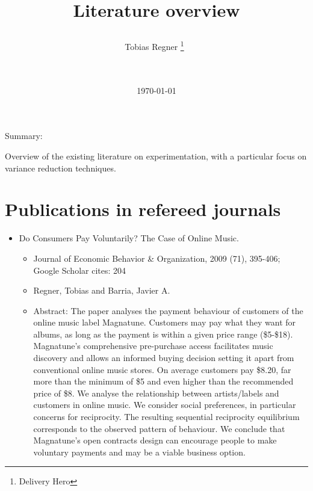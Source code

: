 \documentclass[a4paper,10pt]{article}
\title{\begin{LARGE}Literature overview\end{LARGE}}
\author{Tobias Regner \footnote{Delivery Hero
}~\\
\\
\\
   } %
\date{ \today}
\begin{document}
\maketitle

\vspace{2.5cm}

\begin{center}
Summary:
\end{center}


Overview of the existing literature on experimentation, with a particular focus on variance reduction techniques.

\newpage

\section{Publications in refereed journals}

\begin{itemize}

\item Do Consumers Pay Voluntarily? The Case of Online Music.

\begin{itemize}
\item Journal of Economic Behavior \& Organization, 2009 (71), 395-406; Google Scholar cites: 204
\item Regner, Tobias and Barria, Javier A.

\item Abstract: \tiny The paper analyses the payment behaviour of customers of the online music label Magnatune. Customers may pay what they want for albums, as long as the payment is within a given price range (\$5-\$18). Magnatune's comprehensive pre-purchase access facilitates music discovery and allows an informed buying decision setting it apart from conventional online music stores. On average customers pay \$8.20, far more than the minimum of \$5 and even higher than the recommended price of \$8. We analyse the relationship between artists/labels and customers in online music. We consider social preferences, in particular concerns for reciprocity. The resulting sequential reciprocity equilibrium corresponds to the observed pattern of behaviour. We conclude that Magnatune's open contracts design can encourage people to make voluntary payments and may be a viable business option.

\end{itemize}
\end{itemize}
\end{document}
